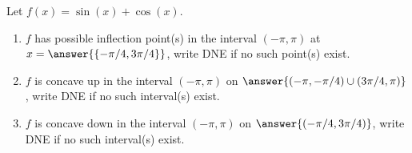 \documentclass{ximera}
\author{Gregory Hartman \and Matthew Carr}
\begin{document}
\begin{exercise}






Let $f(x)=\sin(x)+\cos(x)$.
\begin{enumerate}
\item		$f$ has possible inflection point(s) in the interval $(-\pi,\pi)$ at $x=\answer{\{-\pi/4,3\pi/4\}}$, write DNE if no such point(s) exist.
\item		$f$ is concave up in the interval $(-\pi,\pi)$ on $\answer{(-\pi,-\pi/4)\cup(3\pi/4,\pi)}$, write DNE if no such interval(s) exist.
\item		$f$ is concave down in the interval $(-\pi,\pi)$ on $\answer{(-\pi/4,3\pi/4)}$, write DNE if no such interval(s) exist.
\end{enumerate}

\end{exercise}
\end{document}
